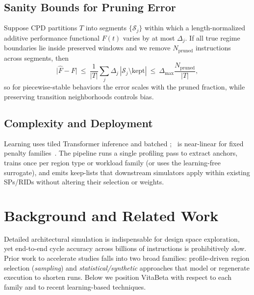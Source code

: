 \subsection{Sanity Bounds for Pruning Error}
Suppose CPD partitions \(T\) into segments \(\{\mathcal{S}_j\}\) within which a length-normalized additive performance functional \(F(t)\) varies by at most \(\Delta_j\). If all true regime boundaries lie inside preserved windows and we remove \(N_{\mathrm{pruned}}\) instructions across segments, then
\[
\big|\widehat{F}-F\big|\ \le\ \frac{1}{|T|}\sum_j \Delta_j\, |\mathcal{S}_j\setminus\text{kept}|\ \le\ \Delta_{\max}\frac{N_{\mathrm{pruned}}}{|T|},
\]
so for piecewise-stable behaviors the error scales with the pruned fraction, while preserving transition neighborhoods controls bias.
\subsection{Complexity and Deployment}
Learning uses tiled Transformer inference and batched \gam; \pelt\ is near-linear for fixed penalty families~\cite{pelt12,ruptures20}. The pipeline runs a single profiling pass to extract anchors, trains once per region type or workload family (or uses the learning-free surrogate), and emits keep-lists that downstream simulators apply within existing SPs/RIDs without altering their selection or weights.
  
 
\section{Background and Related Work}\label{background}
Detailed architectural simulation is indispensable for design space exploration, yet end-to-end cycle accuracy across billions of instructions is prohibitively slow. Prior work to accelerate studies falls into two broad families: profile-driven region selection (\emph{sampling}) and \emph{statistical/synthetic} approaches that model or regenerate execution to shorten runs.  Below we position VitaBeta with respect to each family and to recent learning-based techniques. 
